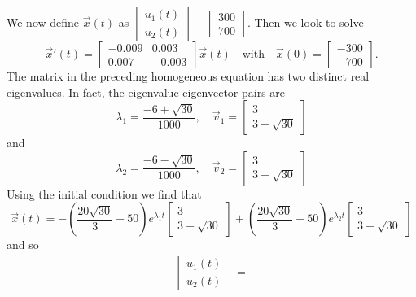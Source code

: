 \documentclass[../book.tex]{subfiles}
\begin{document}
\begin{solution}
We now define \(\vec{x}(t)\) as \(\begin{bmatrix} u_1(t) \\ u_2(t) \end{bmatrix} -\begin{bmatrix} 300 \\ 700 \end{bmatrix}\). Then we look to solve
\begin{equation}\label{eq:sys-47}
\vec{x}'(t) =
\begin{bmatrix}
  -0.009 & 0.003 \\
  0.007 & -0.003
\end{bmatrix}
\vec{x}(t)
\quad
\text{with}
\quad
\vec{x}(0) =
\begin{bmatrix}
  -300 \\ -700
\end{bmatrix}.
\end{equation}
The matrix in the preceding homogeneous equation has two distinct real eigenvalues. In fact, the eigenvalue-eigenvector pairs are
\begin{equation}\label{eq:sys-48}
\lambda_1 =
\frac{-6 + \sqrt{30}}{1000}, \quad \vec{v}_1 = \begin{bmatrix} 3 \\ 3 +\sqrt{30} \end{bmatrix}
\end{equation}
and
\begin{equation}\label{eq:sys-49}
\lambda_2 =
\frac{-6 - \sqrt{30}}{1000}, \quad \vec{v}_2 = \begin{bmatrix} 3 \\ 3 -\sqrt{30} \end{bmatrix}
\end{equation}
Using the initial condition we find that
\begin{equation}\label{eq:sys-50}
\vec{x}(t)
=
-\left(\frac{20\sqrt{30}}{3} + 50\right)  e^{\lambda_1 t} \begin{bmatrix} 3 \\ 3 +\sqrt{30} \end{bmatrix}
+
\left(\frac{20\sqrt{30}}{3} - 50\right) e^{\lambda_2 t} \begin{bmatrix} 3 \\ 3 -\sqrt{30} \end{bmatrix}
\end{equation}
and so
\begin{multline}\label{eq:sys-51}
  \begin{bmatrix} u_1(t) \\ u_2(t) \end{bmatrix} = 

\end{multline}
\end{solution}
\end{document}
